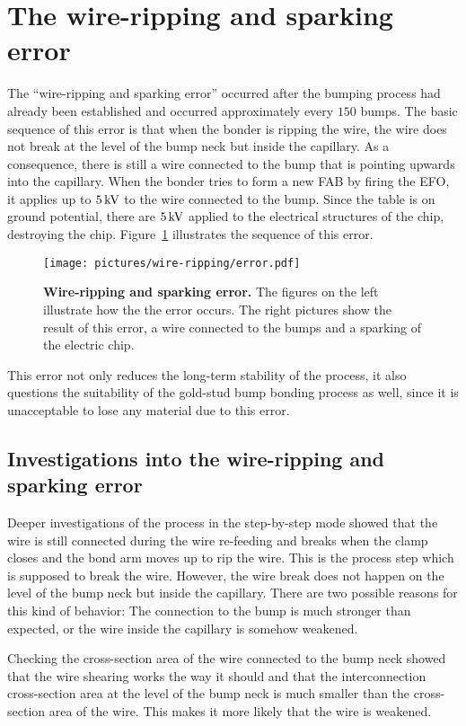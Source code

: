 \section{The wire-ripping and sparking error}\label{sec:wrse}
The ``wire-ripping and sparking error'' occurred after the bumping process had already been established and occurred approximately every $150$ bumps. The basic sequence of this error is that when the bonder is ripping the wire, the wire does not break at the level of the bump neck but inside the capillary. As a consequence, there is still a wire connected to the bump that is pointing upwards into the capillary. When the bonder tries to form a new \ac{FAB} by firing the \ac{EFO}, it applies up to $5\,\rm{kV}$ to the wire connected to the bump. Since the table is on ground potential, there are $5\,\rm{kV}$ applied to the electrical structures of the chip, destroying the chip. Figure~\ref{fig:wire_ripping} illustrates the sequence of this error.
\begin{figure}
\begin{center}
\texttt{[image: pictures/wire-ripping/error.pdf]}
\end{center}
\caption[Wire-ripping and sparking error]{\textbf{Wire-ripping and sparking error.} The figures on the left illustrate how the the error occurs. The right pictures show the result of this error, a wire connected to the bumps and a sparking of the electric chip.}\label{fig:wire_ripping}
\end{figure}
This error not only reduces the long-term stability of the process, it also questions the suitability of the gold-stud bump bonding process as well, since it is unacceptable to lose any material due to this error.
\subsection{Investigations into the wire-ripping and sparking error}
Deeper investigations of the process in the step-by-step mode showed that the wire is still connected during the wire re-feeding and breaks when the clamp closes and the bond arm moves up to rip the wire. This is the process step which is supposed to break the wire. However, the wire break does not happen on the level of the bump neck but inside the capillary. There are two possible reasons for this kind of behavior: The connection to the bump is much stronger than expected, or the wire inside the capillary is somehow weakened.

Checking the cross-section area of the wire connected to the bump neck showed that the wire shearing works the way it should and that the interconnection cross-section area at the level of the bump neck is much smaller than the cross-section area of the wire. This makes it more likely that the wire is weakened.

